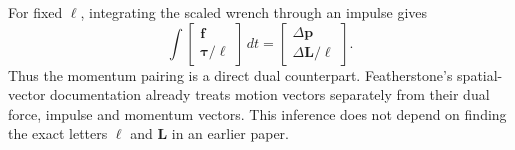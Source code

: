 \documentclass[11pt,a4paper]{article}
\begin{document}
For fixed $\ell$, integrating the scaled wrench through an impulse gives
\begin{equation}
\int\begin{bmatrix}\mathbf f\\\boldsymbol\tau/\ell\end{bmatrix}\,dt
=\begin{bmatrix}\Delta\mathbf p\\\Delta\mathbf L/\ell\end{bmatrix}.
\end{equation}
Thus the momentum pairing is a direct dual counterpart. Featherstone's spatial-vector documentation already treats motion vectors separately from their dual force, impulse and momentum vectors\cite{featherstone}. This inference does not depend on finding the exact letters $\ell$ and $\mathbf L$ in an earlier paper.

\clearpage
\end{document}
